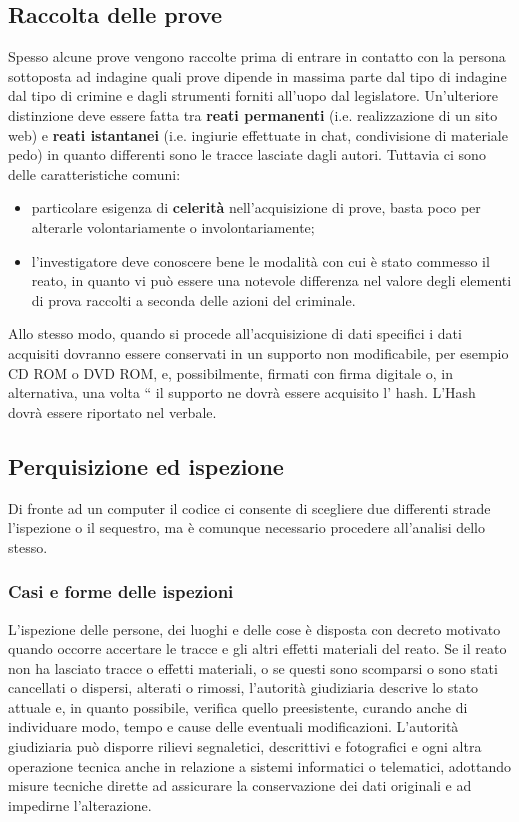 \subsection{Raccolta delle prove}
Spesso alcune prove vengono raccolte prima di entrare in contatto con la persona sottoposta ad indagine quali prove dipende in massima parte dal tipo di indagine dal tipo di crimine e dagli strumenti forniti all’uopo dal legislatore. Un'ulteriore distinzione deve essere fatta tra\textbf{ reati permanenti} (i.e. realizzazione di un sito web) e \textbf{reati istantanei} (i.e. ingiurie effettuate in chat, condivisione di materiale pedo) in quanto differenti sono le tracce lasciate dagli autori. Tuttavia ci sono delle caratteristiche comuni:
\begin{itemize}
    \item  particolare esigenza di \textbf{celerità} nell'acquisizione di prove, basta poco per alterarle volontariamente o involontariamente;
    \item l'investigatore deve conoscere bene le modalità con cui è stato commesso il reato, in quanto vi può essere una notevole differenza nel valore degli elementi di prova raccolti a seconda delle azioni del criminale.
\end{itemize}
Allo stesso modo, quando si procede all'acquisizione di dati specifici i dati acquisiti dovranno essere conservati in un supporto non modificabile, per esempio CD ROM o DVD ROM, e, possibilmente, firmati con firma digitale o, in alternativa, una volta “ il supporto ne dovrà essere acquisito l' hash. L'Hash dovrà essere riportato nel verbale.

\subsection{Perquisizione ed ispezione}
Di fronte ad un computer il codice ci consente di scegliere due differenti strade l'ispezione o il sequestro, ma è comunque necessario procedere all'analisi dello stesso.
\subsubsection{Casi e forme delle ispezioni}
L'ispezione delle persone, dei luoghi e delle cose è disposta con decreto motivato quando occorre accertare le tracce e gli altri effetti materiali del reato. Se il reato non ha lasciato tracce o effetti materiali, o se questi sono scomparsi o sono stati cancellati o dispersi, alterati o rimossi, l'autorità giudiziaria descrive lo stato attuale e, in quanto possibile, verifica quello preesistente, curando anche di individuare modo, tempo e cause delle eventuali modificazioni. L'autorità giudiziaria può disporre rilievi segnaletici, descrittivi e fotografici e ogni altra operazione tecnica anche in relazione a sistemi informatici o telematici, adottando misure tecniche dirette ad assicurare la conservazione dei dati originali e ad impedirne l'alterazione.
